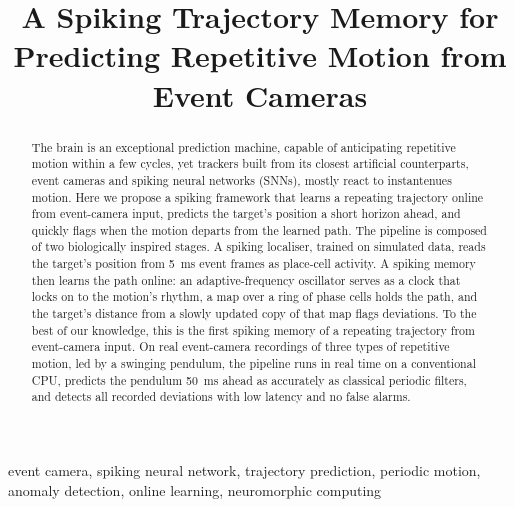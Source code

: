 \documentclass[conference]{IEEEtran}
\begin{document}
\title{A Spiking Trajectory Memory for Predicting Repetitive Motion from Event Cameras}

\author{
}


\maketitle

\begin{abstract}
The brain is an exceptional prediction machine, capable of anticipating repetitive motion within a few cycles, yet trackers built from its closest artificial counterparts, event cameras and spiking neural networks (SNNs), mostly react to instantenues motion. Here we propose a spiking framework that learns a repeating trajectory online from event-camera input, predicts the target's position a short horizon ahead, and quickly flags when the motion departs from the learned path. The pipeline is composed of two biologically inspired stages. A spiking localiser, trained on simulated data, reads the target's position from 5~ms event frames as place-cell activity. A spiking memory then learns the path online: an adaptive-frequency oscillator serves as a clock that locks on to the motion's rhythm, a map over a ring of phase cells holds the path, and the target's distance from a slowly updated copy of that map flags deviations. To the best of our knowledge, this is the first spiking memory of a repeating trajectory from event-camera input. On real event-camera recordings of three types of repetitive motion, led by a swinging pendulum, the pipeline runs in real time on a conventional CPU, predicts the pendulum 50~ms ahead as accurately as classical periodic filters, and detects all recorded deviations with low latency and no false alarms.
\end{abstract}

\begin{IEEEkeywords}
event camera, spiking neural network, trajectory prediction, periodic motion,
anomaly detection, online learning, neuromorphic computing
\end{IEEEkeywords}
\end{document}

